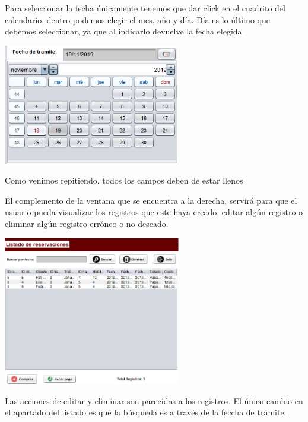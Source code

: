 \documentclass[12pt]{article}
\begin{document}
\begin{flushleft}
\vspace{0.5cm}
\textsf{Para seleccionar la fecha únicamente tenemos que dar click en el cuadrito del calendario, dentro podemos elegir el mes, año y día. Día es lo último que debemos seleccionar, ya que al indicarlo devuelve la fecha elegida.}
\vspace{0.5cm}
\begin{center}
\includegraphics[width=7.75cm]{fecha.png}
\end{center}

\vspace{0.5cm}
\textsf{Como venimos repitiendo, todos los campos deben de estar llenos}

\vspace{0.5cm}
\textsf{El complemento de la ventana que se encuentra a la derecha, servirá para que el usuario pueda visualizar los registros que este haya creado, editar algún registro o eliminar algún registro erróneo o no deseado.}
\vspace{0.5cm}
\begin{center}
\includegraphics[width=7.75cm]{reset.png}
\end{center}

\vspace{0.5cm}
\textsf{Las acciones de editar y eliminar son parecidas a los registros. El único cambio en el apartado del listado es que la búsqueda es a través de la feccha de trámite.}




\end{flushleft}
\end{document}
